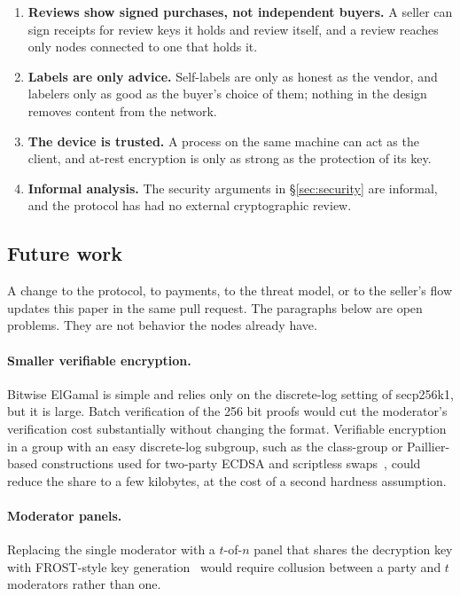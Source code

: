 \begin{enumerate}
  \item \textbf{Reviews show signed purchases, not independent buyers.} A seller can sign receipts for review keys it holds and review itself, and a review reaches only nodes connected to one that holds it.
  \item \textbf{Labels are only advice.} Self-labels are only as honest as the vendor, and labelers only as good as the buyer's choice of them; nothing in the design removes content from the network.
  \item \textbf{The device is trusted.} A process on the same machine can act as the client, and at-rest encryption is only as strong as the protection of its key.
  \item \textbf{Informal analysis.} The security arguments in \S\ref{sec:security} are informal, and the protocol has had no external cryptographic review.
\end{enumerate}

\subsection{Future work}
\label{sec:future}

A change to the protocol, to payments, to the threat model, or to the seller's flow updates this paper in the same pull request. The paragraphs below are open problems. They are not behavior the nodes already have.

\paragraph{Smaller verifiable encryption.} Bitwise ElGamal is simple and relies only on the discrete-log setting of secp256k1, but it is large. Batch verification of the 256 bit proofs would cut the moderator's verification cost substantially without changing the format. Verifiable encryption in a group with an easy discrete-log subgroup, such as the class-group or Paillier-based constructions used for two-party ECDSA and scriptless swaps~\citep{shlomovits2020juggling}, could reduce the share to a few kilobytes, at the cost of a second hardness assumption.

\paragraph{Moderator panels.} Replacing the single moderator with a $t$-of-$n$ panel that shares the decryption key with FROST-style key generation~\citep{komlo2020frost} would require collusion between a party and $t$ moderators rather than one.

